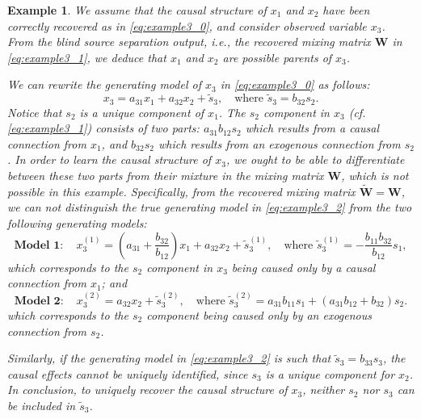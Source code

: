 \documentclass[12pt]{article}
\newtheorem{example}{Example}
\newcommand{\bW}{\mathbf{W}}
\begin{document}
\begin{example}
We assume that the causal structure of $x_1$ and $x_2$ have been correctly recovered as in \eqref{eq:example3_0}, and consider observed variable $x_3$. From the blind source separation output, i.e., the recovered mixing matrix $\bW$ in \eqref{eq:example3_1}, we deduce that $x_1$ and $x_2$ are possible parents of $x_3$. %

We can rewrite the generating model of $x_3$ in \eqref{eq:example3_0} as follows:
\begin{equation}
x_3=a_{31} x_1 + a_{32} x_2 +\tilde{s}_3, \quad \text{where } \tilde{s}_3=b_{32} s_2.
\label{eq:example3_2}
\end{equation}
Notice that $s_2$ is a unique component of $x_1$. The $s_2$ component in $x_3$ (cf. \eqref{eq:example3_1}) consists of two parts: $a_{31} b_{12} s_2$ which results from a causal connection from $x_1$, and $b_{32} s_2$ which results from an exogenous connection from $s_2$. In order to learn the causal structure of $x_3$, we ought to be able to differentiate between these two parts from their mixture in the mixing matrix $\bW$, which is not possible in this example. Specifically, from the recovered mixing matrix $\tilde{\bW}=\bW$, we can not distinguish the true generating model in \eqref{eq:example3_2} from the two following generating models:
\begin{equation*}
\textbf{Model 1}: \quad x_3^{(1)} = \left(a_{31} + \frac{b_{32}}{b_{12}}\right) x_1 + a_{32} x_2 + \tilde{s}_3^{(1)},\quad \text {where } \tilde{s}_3^{(1)} = - \frac{b_{11}b_{32}}{b_{12}} s_1,
\label{eq:ex14}
\end{equation*}
which corresponds to the $s_2$ component in $x_3$ being caused only by a causal connection from $x_1$; and
\begin{equation*}
\textbf{Model 2}: \quad x_3^{(2)} = a_{32} x_2 + \tilde{s}_3^{(2)},\quad \text {where }\tilde{s}_3^{(2)} = a_{31}b_{11}s_1 + (a_{31}b_{12} + b_{32})s_2.
\label{eq:ex15}
\end{equation*}
which corresponds to the $s_2$ component being caused only by an exogenous connection from $s_2$.

Similarly, if the generating model in \eqref{eq:example3_2} is such that $\tilde{s}_3= b_{33} s_3$, the causal effects cannot be uniquely identified, since $s_3$ is a unique component for $x_2$. In conclusion, to uniquely recover the causal structure of $x_3$, neither $s_2$ nor $s_3$ can be included in $\tilde{s}_3$.


\end{example}
\end{document}
